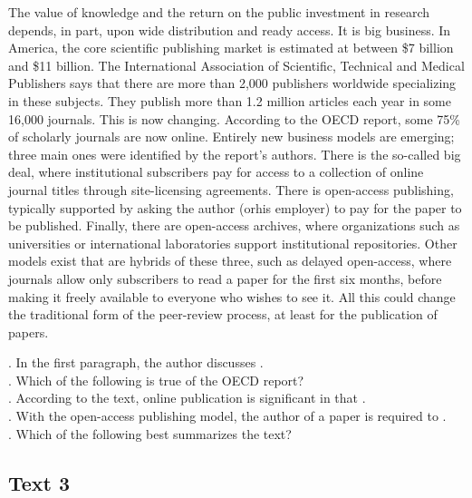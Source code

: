 The value of knowledge and the return on the public investment in research depends, in part, upon wide distribution and ready access. It is big business. In America, the core scientific publishing market is estimated at between \$7 billion and \$11 billion. The International Association of Scientific, Technical and Medical Publishers says that there are more than 2,000 publishers worldwide specializing in these subjects. They publish more than 1.2 million articles each year in some 16,000 journals.
This is now changing. According to the OECD report, some 75\% of scholarly journals are now online. Entirely new business models are emerging; three main ones were identified by the report’s authors. There is the so-called big deal, where institutional subscribers pay for access to a collection of online journal titles through site-licensing agreements. There is open-access publishing, typically supported by asking the author (orhis employer) to pay for the paper to be published. Finally, there are open-access archives, where organizations such as universities or international laboratories support institutional repositories. Other models exist that are hybrids of these three, such as delayed open-access, where journals allow only subscribers to read a paper for the first six months, before making it freely available to everyone who wishes to see it. All this could change the traditional form of the peer-review process, at least for the publication of papers.
\begin{questions} . In the first paragraph, the author discusses .
\\ . Which of the following is true of the OECD report?
\\ . According to the text, online publication is significant in that .
\\ . With the open-access publishing model, the author of a paper is required to .
\\ . Which of the following best summarizes the text?
\\ \end{questions}      \subsection{Text 3}
